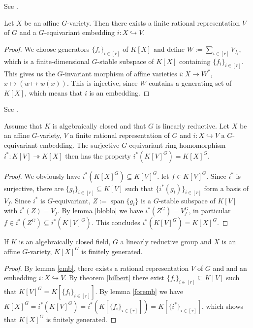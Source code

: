\begin{lemma}\label{emb}
  See \cite[A1.9]{DK15}.
  
  Let $X$ be an affine $G$-variety.
  Then there exists a finite rational representation $V$ of $G$ and a $G$-equivariant embedding $i \colon X \hookrightarrow V$.
\end{lemma}

\begin{proof}
  We choose generators $\{f_i\}_{i \in [r]}$ of $K[X]$ and define $W := \sum_{i \in [r]} V_{f_i}$, which is a finite-dimensional $G$-stable subspace of $K[X]$ containing $\{f_i\}_{i \in [r]}$.
  This gives us the $G$-invariant morphism of affine varieties $i \colon X \longrightarrow W^\ast$, $x \mapsto (w \mapsto w(x))$.
  This is injective, since $W$ contains a generating set of $K[X]$, which means that $i$ is an embedding.
\end{proof}

\begin{lemma}\label{foremb}
  See \cite[2.2.9]{DK15}.
  
  Assume that $K$ is algebraically closed and that $G$ is linearly reductive.
  Let $X$ be an affine $G$-variety, $V$ a finite rational representation of $G$ and $i \colon X \hookrightarrow V$ a $G$-equivariant embedding.
  The surjective $G$-equivariant ring homomorphism $i^\ast \colon K[V] \twoheadrightarrow K[X]$ then has the property $i^\ast (K[V]^G) = K[X]^G$.
\end{lemma}

\begin{proof}
  We obviously have $i^\ast(K[X]^G) \subseteq K[V]^G$.
  let $f \in K[V]^G$.
  Since $i^\ast$ is surjective, there are $ \{g_i\}_{i \in [r]} \subseteq K[V]$ such that $\{i^\ast(g_i)\}_{i \in [r]}$ form a basis of $V_f$.
  Since $i^\ast$ is $G$-equivariant, $Z := \operatorname{span}\{g_i\}$ is a $G$-stable subspace of $K[V]$ with $i^\ast(Z) = V_f$.
  By lemma \ref{bloblo} we have $i^\ast (Z^G) = V_f^G$, in particular $f \in i^\ast (Z^G) \subseteq i^\ast(K[V]^G)$.
  This concludes $i^\ast(K[V]^G) = K[X]^G$.
\end{proof}

\begin{theorem}
  If $K$ is an algebraically closed field, $G$ a linearly reductive group and $X$ is an affine $G$-variety, $K[X]^G$ is finitely generated.
\end{theorem}

\begin{proof}
  By lemma \ref{emb}, there exists a rational representation $V$ of $G$ and and an embedding $i \colon X \hookrightarrow V$.
  By theorem \ref{hilbert} there exist $ \{f_i\}_{i \in [r]} \subseteq K[V]$ such that $K[V]^G = K[\{f_i\}_{i \in [r]}]$.
  By lemma \ref{foremb} we have $K[X]^G = i^\ast (K[V]^G) = i^\ast (K[\{f_i\}_{i \in [r]}]) = K[\{i^\ast\}_{i \in [r]}]$, which shows that $K[X]^G$ is finitely generated.
\end{proof}

